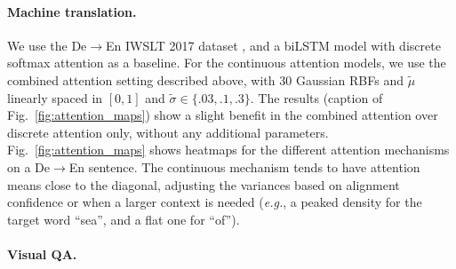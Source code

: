 \documentclass{article}
\begin{document}
\paragraph{Machine translation.} 

We use the De$\to$En IWSLT 2017 dataset \citep{cettolo2017overview}, and a biLSTM model with discrete softmax attention as a baseline. 
For the continuous attention models, we use the combined attention setting described above, with 30 Gaussian RBFs and $\tilde{\mu}$ linearly spaced in $[0,1]$ and $\tilde{\sigma} \in \{.03, .1, .3\}$. 
The results (caption of Fig.~\ref{fig:attention_maps}) show a slight benefit in the combined  attention over discrete attention only, without any additional parameters. Fig.~\ref{fig:attention_maps} shows heatmaps for the different attention mechanisms on a De$\to$En sentence. The continuous mechanism tends to have attention means close to the diagonal,   adjusting the variances based on alignment confidence or when a larger context is needed ({\it e.g.}, a peaked density for the target word ``sea'', and a flat one for ``of'').


\begin{comment}
\begin{SCtable}[][t]
    \caption{BLEU scores for the De$\to$En machine translation task.} 
    \label{table:results_nmt}
    \begin{small}
\begin{tabular}{lc}
        \toprule
        {\sc Attention}     		& BLEU (\%)		 	\\
        \midrule
        Discrete     		& 23.92		 	\\
        \midrule
        Disc. + Cont. softmax		& 24.00		  	\\
        Disc. + Cont. sparsemax	 	& \bf 24.25		  	\\
        \bottomrule
    \end{tabular}
\end{small}
\end{SCtable}
\end{comment}


\paragraph{Visual QA.} 
\end{document}
